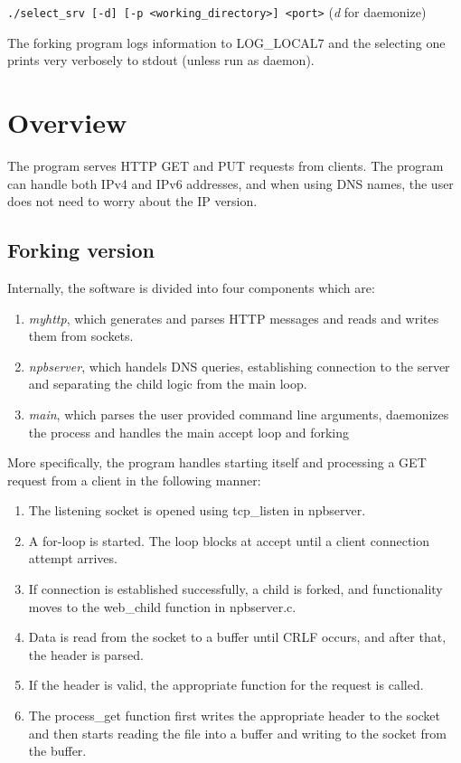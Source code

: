 \documentclass[a4paper,12pt]{article}
\begin{document}
{\tt ./select\_srv [-d] [-p <working\_directory>] <port>} (\emph{d} for daemonize)

The forking program logs information to LOG\_LOCAL7 and the selecting one prints very verbosely to stdout (unless run as daemon).

\section{Overview}

The program serves HTTP GET and PUT requests from clients. The program can handle both IPv4 and IPv6 addresses, and when using DNS names, the user does not need to worry about the IP version.

\subsection{Forking version}
Internally, the software is divided into four components which are:

\begin{enumerate}
\item \emph{myhttp}, which generates and parses HTTP messages and reads and writes them from sockets.
\item \emph{npbserver}, which handels DNS queries, establishing connection to the server and separating the child logic from the main loop.
\item \emph{main}, which parses the user provided command line arguments, daemonizes the process and handles the main accept loop and forking
\end{enumerate}

More specifically, the program handles starting itself and processing a GET request from a client in the following manner:

\sloppy

\begin{enumerate}
\item The listening socket is opened using tcp\_listen in npbserver.
\item A for-loop is started. The loop blocks at accept until a client connection attempt arrives.
\item If connection is established successfully, a child is forked, and functionality moves to the web\_child function in npbserver.c.
\item Data is read from the socket to a buffer until CRLF occurs, and after that, the header is parsed.
\item If the header is valid, the appropriate function for the request is called.
\item The process\_get function first writes the appropriate header to the socket and then starts reading the file into a buffer and writing to the socket from the buffer.
\end{enumerate}
\end{document}
